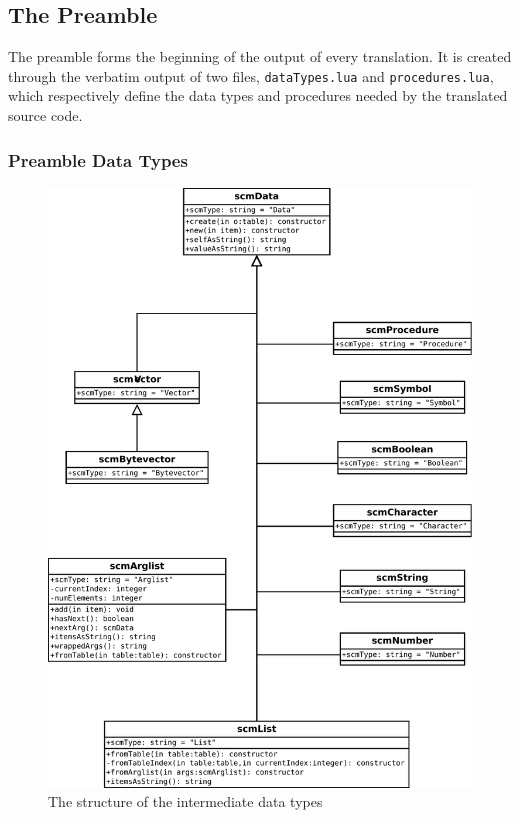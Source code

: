 \subsection{The Preamble}

The preamble forms the beginning of the output of every translation. It is
created through the verbatim output of two files, \texttt{dataTypes.lua} and
\texttt{procedures.lua}, which respectively define the data types and procedures
needed by the translated source code.

\subsubsection{Preamble Data Types}

\begin{figure}
\centering
\includegraphics[width=\textwidth]{scmDataUML.pdf}
\caption{The structure of the intermediate data types}
\label{fig:scmDataUML}
\end{figure}

